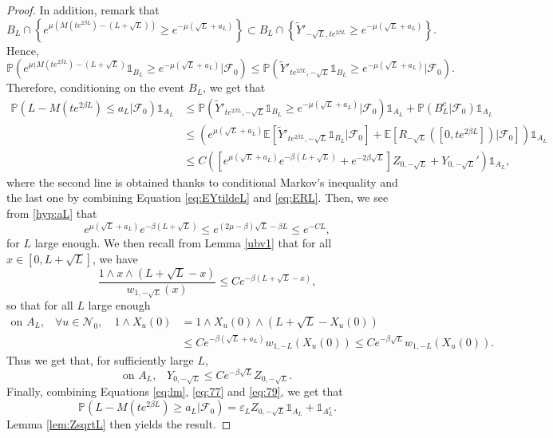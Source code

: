 \documentclass[11pt]{article}
\theoremstyle{plain}
\newcommand\vep{\varepsilon}
\begin{document}
\begin{proof}
In addition, remark that
$$B_L\cap \left\{e^{\mu(M(te^{2\beta L})-(L+\sqrt{L}))}\geqslant e^{-\mu (\sqrt{L}+a_L)}\right\} \subset B_L\cap \left\{\tilde{Y}'_{-\sqrt{L},te^{2\beta L}}\geqslant e^{-\mu (\sqrt{L}+a_L)}\right\}.
$$
Hence, 
\begin{equation*}
\mathbb{P}\left(e^{\mu(M(te^{2\beta L})-(L+\sqrt{L})}\mathbb{1}_{B_L}\geqslant e^{-\mu (\sqrt{L}+a_L)}|\mathcal{F}_0\right)\leqslant \mathbb{P}\left(\tilde{Y}'_{te^{2\beta L},-\sqrt{L}}\mathbb{1}_{B_L}\geqslant e^{-\mu (\sqrt{L}+a_L)}|\mathcal{F}_0\right).
\end{equation*}
Therefore, conditioning on the event $B_L$, we get that
\begin{align}
\mathbb{P}\left(L-M(te^{2\beta L})\leqslant a_L|\mathcal{F}_0\right)\mathbb{1}_{A_L}& \leqslant \mathbb{P}\left(\tilde{Y}'_{te^{2\beta L},-\sqrt{L}}\mathbb{1}_{B_L}\geqslant e^{-\mu (\sqrt{L}+a_L)}|\mathcal{F}_0\right)\mathbb{1}_{A_L}+\mathbb{P}\left(B_L^c|\mathcal{F}_0\right)\mathbb{1}_{A_L}\nonumber\\
&\leqslant \left(e^{\mu(\sqrt{L}+a_L)}\mathbb{E}\left[\tilde{Y}'_{te^{2\beta L},{-\sqrt{L}}}\mathbb{1}_{B_L}|\mathcal{F}_0\right]+\mathbb{E}\left[R_{-\sqrt{L}}([0,te^{2\beta L}])|\mathcal{F}_0\right]\right)\mathbb{1}_{A_L}\nonumber\\
&\leqslant C\left(\left[e^{\mu(\sqrt{L}+a_L)}e^{-\beta(L+\sqrt{L})}+e^{-2\beta \sqrt{L}}\right]Z_{0,-\sqrt{L}}+Y_{0,-\sqrt{L}}'\right)\mathbb{1}_{A_L},\label{eq:77}
\end{align}
where the second line is obtained thanks to conditional Markov's inequality and the last one by combining Equation \eqref{eq:EYtildeL} and \eqref{eq:ERL}. Then, we see from \eqref{hyp:aL}  that
 $$e^{\mu(\sqrt{L}+a_L)}e^{-\beta(L+\sqrt{L})}\leqslant e^{(2\mu-\beta)\sqrt{L}-\beta L}\leqslant e^{-CL},$$
for $L$ large enough.
We then recall from Lemma \ref{ubv1} that for all $x\in[0,L+\sqrt{L}]$, we have 
\begin{equation*}
\frac{1\wedge x\wedge (L+\sqrt{L}-x)}{w_{1,-\sqrt{L}}(x)}\leqslant Ce^{-\beta(L+\sqrt{L}-x)},
\end{equation*}
so that for all $L$ large enough 
\begin{align*}
\text{on $A_L$,}\quad \forall u\in \mathcal{N}_0, \quad 1\wedge X_u(0) &= 1\wedge X_u(0)\wedge (L+\sqrt{L}-X_u(0)) \\
&\leqslant C e^{-\beta (\sqrt{L}+a_L)}w_{1,-L}(X_u(0))\leqslant C e^{-\beta \sqrt{L}}w_{1,-L}(X_u(0)).
\end{align*}
Thus we get that, for sufficiently large $L$,
\begin{equation}
\text{on $A_L$,} \quad  Y_{0,-\sqrt{L}}\leqslant C e^{-\beta \sqrt{L}}Z_{0,-\sqrt{L}}.\label{eq:79}
\end{equation}
Finally, combining Equations \eqref{eq:lm}, \eqref{eq:77} and \eqref{eq:79}, we get that
\begin{equation}
\mathbb{P}\left(L-M(te^{2\beta L})\geqslant a_L|\mathcal{F}_0\right)= \vep_LZ_{0,-\sqrt{L}}\mathbb{1}_{A_L}+\mathbb{1}_{A_L^c} \label{IQ:aL}. 
\end{equation}
Lemma \ref{lem:ZsqrtL} then yields the result.
\end{proof}
\end{document}
